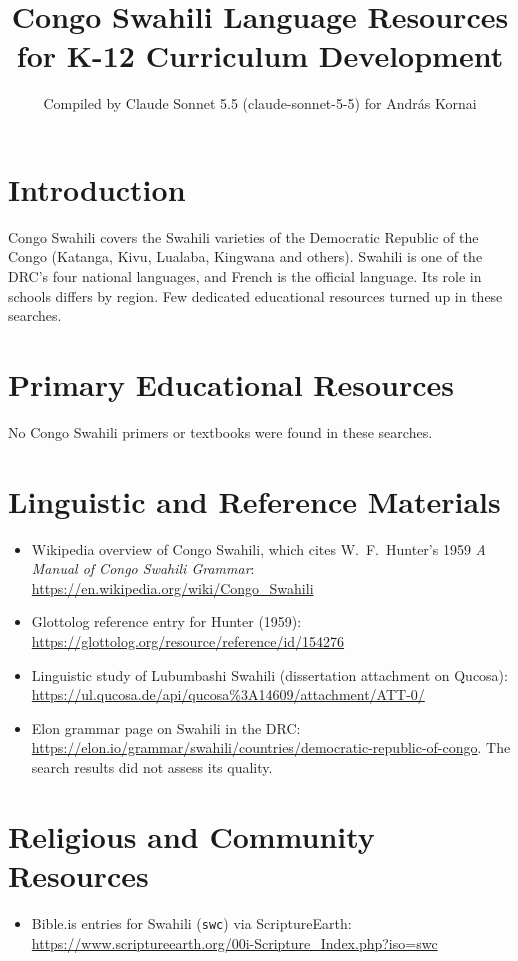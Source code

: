 \documentclass[12pt]{article}
\title{Congo Swahili Language Resources for K-12 Curriculum Development}
\author{Compiled by Claude Sonnet 5.5 (claude-sonnet-5-5) for Andr\'as Kornai}
\date{}
\begin{document}
\maketitle

\section{Introduction}
Congo Swahili covers the Swahili varieties of the Democratic Republic of the Congo (Katanga, Kivu, Lualaba, Kingwana and others). Swahili is one of the DRC's four national languages, and French is the official language. Its role in schools differs by region. Few dedicated educational resources turned up in these searches.

\section{Primary Educational Resources}
No Congo Swahili primers or textbooks were found in these searches.

\section{Linguistic and Reference Materials}
\begin{itemize}
\item Wikipedia overview of Congo Swahili, which cites W.\ F.\ Hunter's 1959 \textit{A Manual of Congo Swahili Grammar}: \url{https://en.wikipedia.org/wiki/Congo_Swahili}
\item Glottolog reference entry for Hunter (1959): \url{https://glottolog.org/resource/reference/id/154276}
\item Linguistic study of Lubumbashi Swahili (dissertation attachment on Qucosa): \url{https://ul.qucosa.de/api/qucosa%3A14609/attachment/ATT-0/}
\item Elon grammar page on Swahili in the DRC: \url{https://elon.io/grammar/swahili/countries/democratic-republic-of-congo}. The search results did not assess its quality.
\end{itemize}

\section{Religious and Community Resources}
\begin{itemize}
\item Bible.is entries for Swahili (\texttt{swc}) via ScriptureEarth: \url{https://www.scriptureearth.org/00i-Scripture_Index.php?iso=swc}
\end{itemize}
\end{document}
